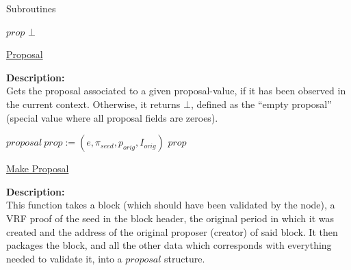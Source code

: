 \documentclass[10pt,a4paper]{article}
\begin{document}
\begin{section}{Subroutines}
\begin{algorithm}[H]
\begin{algorithmic}[1]
        \State \Return $prop$
    \Else
        \State \Return $\bot$
    \EndIf

    \EndFunction
    \end{algorithmic}
    \caption{\underline{Proposal}}
\end{algorithm}

\noindent \textbf{Description:}\\ Gets the proposal associated to a given proposal-value, 
if it has been observed in the current context.
Otherwise, it returns $\bot$, defined as the ``empty proposal'' (special value where all
proposal fields are zeroes).

\begin{algorithm}[H]
    \begin{algorithmic}[1]

        \State $proposal \ prop := (e, \pi_{seed}, p_{orig}, I_{orig})$
        \Return $prop$

    \EndFunction
    \end{algorithmic}
    \caption{\underline{Make Proposal}}
\end{algorithm}


\noindent \textbf{Description:}\\ This function takes a block (which should have been validated by the node),
a VRF proof of the seed in the block header, the original period in which it was created and the address of the
original proposer (creator) of said block. It then packages the block, and all the other data which corresponds
with everything needed to validate it, into a $proposal$ structure.

\begin{algorithm}[H]\label{proposal-value}
    \begin{algorithmic}[1]


\end{algorithmic}
\end{algorithm}
\end{section}
\end{document}

